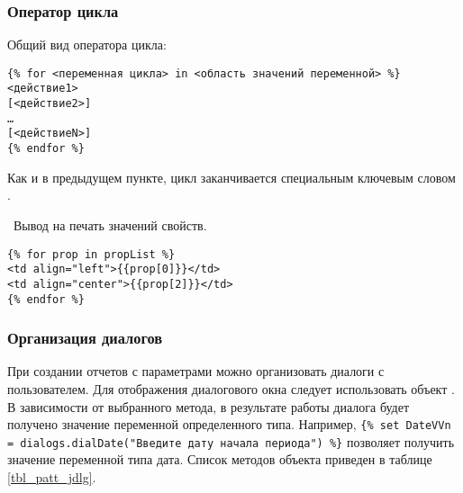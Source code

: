 \subsubsection{Оператор цикла}

Общий вид оператора цикла:
\begin{verbatim}
{% for <переменная цикла> in <область значений переменной> %}
<действие1>
[<действие2>]
…
[<действиеN>]
{% endfor %}
\end{verbatim}

Как и в предыдущем пункте, цикл заканчивается специальным ключевым словом .

 ~Вывод на печать значений свойств.
\begin{verbatim}
{% for prop in propList %} 
<td align="left">{{prop[0]}}</td> 
<td align="center">{{prop[2]}}</td>
{% endfor %}
\end{verbatim}

\subsubsection{Организация диалогов}

При создании отчетов с параметрами можно организовать диалоги с пользователем. Для отображения диалогового окна следует использовать объект . В зависимости от выбранного метода, в результате работы диалога будет получено значение переменной определенного типа. Например, \verb|{% set DateVVn = dialogs.dialDate("Введите дату начала периода") %}| позволяет получить значение переменной  типа дата. Список методов объекта  приведен в таблице \ref{tbl_patt_jdlg}.

